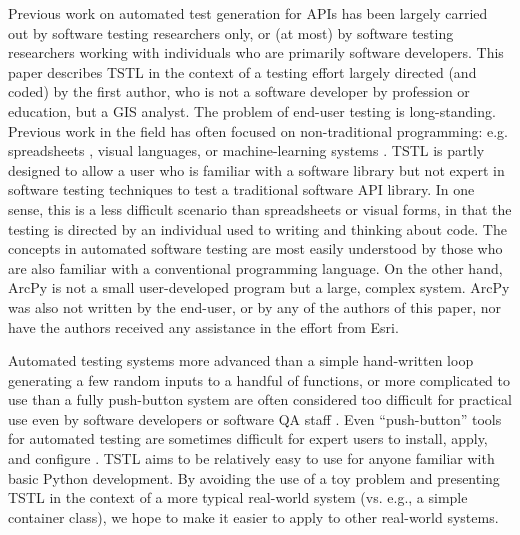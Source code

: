 Previous work on automated test generation for APIs has been largely carried
out by software testing researchers only, or (at most) by software
testing researchers working with individuals who are primarily
software developers.  This paper describes TSTL in the context of a
testing effort largely directed (and coded) by the first author, who is not a
software developer by profession or education, but a GIS analyst.
The problem of end-user testing
\cite{burnettEUSE,Silos,rothermelTOSEM} is long-standing.  Previous
work in the field has often focused on
non-traditional programming: e.g. spreadsheets
\cite{rothermelTOSEM}, visual languages, or machine-learning systems
\cite{OnlyOracle}.  TSTL is partly designed to allow a user who is
familiar with a software library but not expert in software testing
techniques to test a traditional software API library.  In one sense,
this is a less difficult scenario than spreadsheets
or visual forms, in that the testing is directed by an individual used
to writing and thinking about code.  The concepts in
automated software testing are most easily understood by those
who are also familiar with a conventional
programming language.  On the other hand, ArcPy is
not a small user-developed program but a large, complex system.
ArcPy was also not written by the end-user, or by any of the authors
of this paper, nor have the authors received any assistance in the
effort from Esri.

Automated testing systems more advanced than a simple hand-written
loop generating a few random inputs to a handful of functions, or more
complicated to use than a fully push-button system are often
considered too difficult for practical use even by software developers
or software QA staff \cite{ISSRE12}. Even ``push-button'' tools for
automated testing are sometimes difficult for expert users to install,
apply, and configure \cite{AMAI,CFV08,ISSRE12}.  TSTL aims to be
relatively easy to use for anyone familiar with basic Python
development.  By avoiding the use of a toy problem and presenting TSTL
in the context of a more typical real-world system (vs. e.g., a simple
container class), we hope to make it easier to apply to other
real-world systems.



